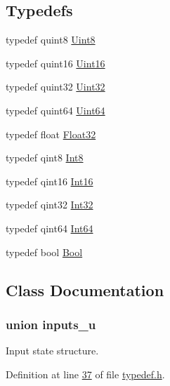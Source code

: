 \subsection*{Typedefs}
\begin{DoxyCompactItemize}
\item 
typedef quint8 \hyperlink{a00001_a979e3e23b9a449e69ab6a8a83b6042f8}{Uint8}
\item 
typedef quint16 \hyperlink{a00001_aae7407b021d43f7193a81a58cfb3e297}{Uint16}
\item 
typedef quint32 \hyperlink{a00001_ab56a7153a5b218eac7698ff141009735}{Uint32}
\item 
typedef quint64 \hyperlink{a00001_a3ea80e954e940df6ac162951653f72c4}{Uint64}
\item 
typedef float \hyperlink{a00001_a87d38f886e617ced2698fc55afa07637}{Float32}
\item 
typedef qint8 \hyperlink{a00001_aafb609548b1aa0152c46f9205b79d0f0}{Int8}
\item 
typedef qint16 \hyperlink{a00001_a3985266aecb120f269789241c170850c}{Int16}
\item 
typedef qint32 \hyperlink{a00001_a08efbac01a8d7a9e41a7aa093260ca4a}{Int32}
\item 
typedef qint64 \hyperlink{a00001_a71a4edacadbbbcd18988a2f09f959b1e}{Int64}
\item 
typedef bool \hyperlink{a00001_a76a8b016e5ad61faf9062cc387df5016}{Bool}
\end{DoxyCompactItemize}


\subsection{Class Documentation}
\label{d4/d63/a00082}
\hypertarget{a00001_d4/d63/a00082}{}
\subsubsection{union inputs\+\_\+u}
Input state structure. 

Definition at line \hyperlink{a00001_source_l00037}{37} of file \hyperlink{a00001_source}{typedef.\+h}.




